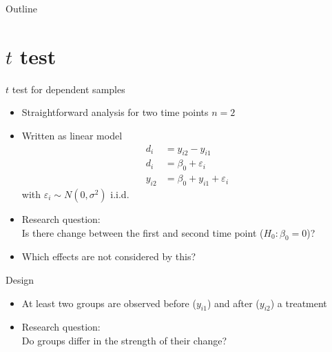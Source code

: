 \documentclass[aspectratio=169]{beamer}
\begin{document}
\begin{frame}{Outline}
\tableofcontents
\end{frame}

\section[t test]{$t$ test}

\begin{frame}{$t$ test for dependent samples}
\begin{itemize}
  \item Straightforward analysis for two time points $n = 2$
  \item Written as linear model
    \begin{align*}
         d_i &= y_{i2} - y_{i1} \\
         d_i &= \beta_0 + \varepsilon_i \\
      y_{i2} &= \beta_0 + y_{i1} + \varepsilon_i
    \end{align*}
    with $\varepsilon_i \sim N(0, \sigma^2)$ i.i.d.
  \item Research question:\\
    Is there change between the first and second time point ($H_0\colon \beta_0 = 0$)?
  \item Which effects are not considered by this?
\end{itemize}
\end{frame}

\begin{frame}{Design}
\begin{itemize}
    \item At least two groups are observed before ($y_{i1}$) and after
      ($y_{i2}$) a treatment
        \begin{center}
        \end{center}
      \item Research question:\\
      Do groups differ in the strength of their change?
\end{itemize}
\end{frame}
\end{document}
